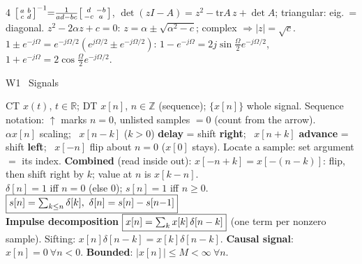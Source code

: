 \documentclass[a4paper,landscape]{article}
\newcommand{\sect}[1]{\par\vspace{1pt}\noindent\colorbox{secblue}{\parbox{\dimexpr\linewidth-2\fboxsep}{\color{white}\bfseries\fontsize{6.8}{7.6}\selectfont\strut #1}}\par\vspace{0.4pt}}
\newcommand{\bx}[1]{\fbox{$\textstyle #1$}}
\begin{document}
\begin{multicols*}{4}
$\begin{bsmallmatrix}a&b\\c&d\end{bsmallmatrix}^{-1}{=}\frac{1}{ad-bc}\begin{bsmallmatrix}d&-b\\-c&a\end{bsmallmatrix}$, $\det(zI{-}A)=z^2-\mathrm{tr}A\,z+\det A$; triangular: eig.\ = diagonal.
$z^2-2\alpha z+c=0$: $z=\alpha\pm\sqrt{\alpha^2-c}$; complex $\Rightarrow|z|=\sqrt c$.
$1\pm e^{-j\Omega}=e^{-j\Omega/2}(e^{j\Omega/2}\pm e^{-j\Omega/2})$: $1{-}e^{-j\Omega}=2j\sin\frac\Omega2e^{-j\Omega/2}$, $1{+}e^{-j\Omega}=2\cos\frac\Omega2e^{-j\Omega/2}$.

\sect{W1 \ Signals}
CT $x(t)$, $t\in\mathbb R$; DT $x[n]$, $n\in\mathbb Z$ (sequence); $\{x[n]\}$ whole signal. Sequence notation: $\uparrow$ marks $n{=}0$, unlisted samples $=0$ (count from the arrow).\\
$\alpha x[n]$ scaling; \ $x[n{-}k]$ ($k{>}0$) \textbf{delay} = shift \textbf{right}; \ $x[n{+}k]$ \textbf{advance} = shift \textbf{left}; \ $x[-n]$ flip about $n{=}0$ ($x[0]$ stays). Locate a sample: set argument $=$ its index.
\textbf{Combined} (read inside out): $x[-n{+}k]=x[-(n{-}k)]$: flip, then shift right by $k$; value at $n$ is $x[k-n]$.\\
$\delta[n]{=}1$ iff $n{=}0$ (else 0); $s[n]{=}1$ iff $n\ge0$. \ $\bx{s[n]=\sum_{k\le n}\delta[k],\ \delta[n]=s[n]-s[n{-}1]}$\\
\textbf{Impulse decomposition} $\bx{x[n]=\sum_kx[k]\,\delta[n-k]}$ (one term per nonzero sample). Sifting: $x[n]\delta[n{-}k]=x[k]\delta[n{-}k]$.
\textbf{Causal signal}: $x[n]{=}0\ \forall n{<}0$. \textbf{Bounded}: $|x[n]|\le M<\infty\ \forall n$.


\end{multicols*}
\end{document}
